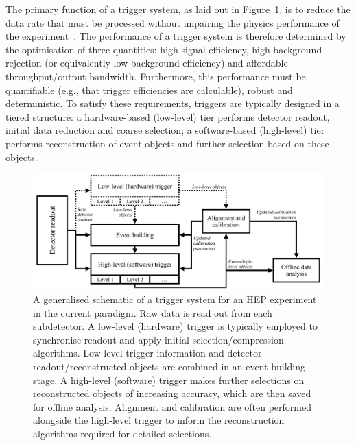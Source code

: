 The primary function of a trigger system, as laid out in Figure~\ref{trigger-schema}, is to reduce the data rate that must be processed without impairing the physics performance of the experiment~\cite{Jeitler_2017, Smith2020, Beck_2007, ellis2010trigger}. The performance of a trigger system is therefore determined by the optimisation of three quantities: high signal efficiency, high background rejection (or equivalently low background efficiency) and affordable throughput/output bandwidth. Furthermore, this performance must be quantifiable (e.g., that trigger efficiencies are calculable), robust and deterministic. To satisfy these requirements, triggers are typically designed in a tiered structure: a hardware-based (low-level) tier performs detector readout, initial data reduction and coarse selection; a software-based (high-level) tier performs reconstruction of event objects and further selection based on these objects.

\begin{figure}[h!]
    \centering
    \includegraphics[width=\linewidth]{images/trigger_schematic.pdf}
    \caption[A generalised schematic of a trigger system for a HEP experiment in the current paradigm. Raw data is read out from each subdetector. A low-level (hardware) trigger is typically employed to synchronise readout and apply initial selection/compression algorithms. A high-level (software) trigger makes further selections on reconstructed objects of increasing accuracy, which are then saved for offline analysis. Alignment and calibration are often performed alongside the high-level trigger to inform the reconstruction algorithms required for detailed selections.]{A generalised schematic of a trigger system for an HEP experiment in the current paradigm. Raw data is read out from each subdetector. A low-level (hardware) trigger is typically{\protect\footnotemark} employed to synchronise readout and apply initial selection/compression algorithms. Low-level trigger information and detector readout/reconstructed objects are combined in an event building stage. A high-level (software) trigger makes further selections on reconstructed objects of increasing accuracy, which are then saved for offline analysis. Alignment and calibration are often performed alongside the high-level trigger to inform the reconstruction algorithms required for detailed selections.}
    \label{trigger-schema}
\end{figure}

